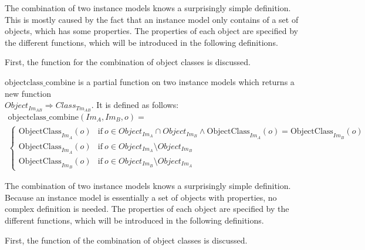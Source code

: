 The combination of two instance models knows a surprisingly simple definition. This is mostly caused by the fact that an instance model only contains of a set of objects, which has some properties. The properties of each object are specified by the different functions, which will be introduced in the following definitions.

First, the function for the combination of object classes is discussed.

\begin{defin}
\label{defin:transformation_framework:instance_models_and_instance_graphs:combining_instance_models:objectclass_combine}
$\mathrm{objectclass\_\!combine}$ is a partial function on two instance models which returns a new function \\$Object_{Im_{AB}} \Rightarrow Class_{Tm_{AB}}$. It is defined as follows:
\begin{multline*}
    \mathrm{objectclass\_\!combine}(Im_{A}, Im_{B}, o) = \\
        \begin{cases}
        \mathrm{ObjectClass}_{Im_A}(o) & \mathrm{if }\ o \in Object_{Im_A} \cap Object_{Im_B} \land \mathrm{ObjectClass}_{Im_A}(o) = \mathrm{ObjectClass}_{Im_B}(o) \\
        \mathrm{ObjectClass}_{Im_A}(o) & \mathrm{if }\ o \in Object_{Im_A} \setminus Object_{Im_B} \\
        \mathrm{ObjectClass}_{Im_B}(o) & \mathrm{if }\ o \in Object_{Im_B} \setminus Object_{Im_A}
    \end{cases}
\end{multline*}
\end{defin}

The combination of two instance models knows a surprisingly simple definition. Because an instance model is essentially a set of objects with properties, no complex definition is needed. The properties of each object are specified by the different functions, which will be introduced in the following definitions.

First, the function of the combination of object classes is discussed.

